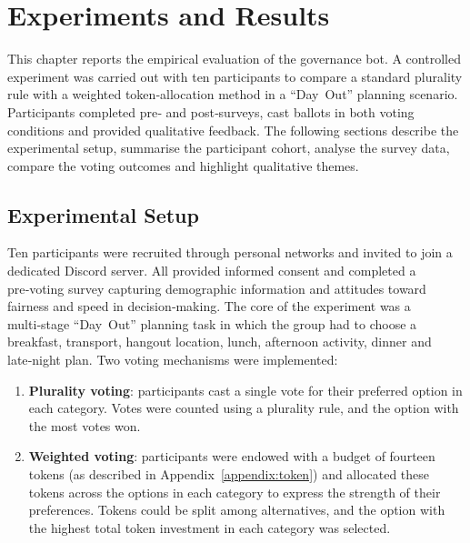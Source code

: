 \doublespacing %

\chapter{Experiments and Results}
\label{ch:experiments}

\begin{spacing}{1} %
\minitoc %
\end{spacing} %
\thesisspacing %

This chapter reports the empirical evaluation of the governance bot.  A controlled experiment was carried out with ten participants to compare a standard plurality rule with a weighted token‑allocation method in a ``Day~Out'' planning scenario.  Participants completed pre‑ and post‑surveys, cast ballots in both voting conditions and provided qualitative feedback.  The following sections describe the experimental setup, summarise the participant cohort, analyse the survey data, compare the voting outcomes and highlight qualitative themes.

\section{Experimental Setup}

Ten participants were recruited through personal networks and invited to join a dedicated Discord server.  All provided informed consent and completed a pre‑voting survey capturing demographic information and attitudes toward fairness and speed in decision‑making.  The core of the experiment was a multi‑stage ``Day~Out'' planning task in which the group had to choose a breakfast, transport, hangout location, lunch, afternoon activity, dinner and late‑night plan.  Two voting mechanisms were implemented:

\begin{enumerate}
    \item \textbf{Plurality voting}: participants cast a single vote for their preferred option in each category.  Votes were counted using a plurality rule, and the option with the most votes won.
    \item \textbf{Weighted voting}: participants were endowed with a budget of fourteen tokens (as described in Appendix~\ref{appendix:token}) and allocated these tokens across the options in each category to express the strength of their preferences.  Tokens could be split among alternatives, and the option with the highest total token investment in each category was selected.
\end{enumerate}

